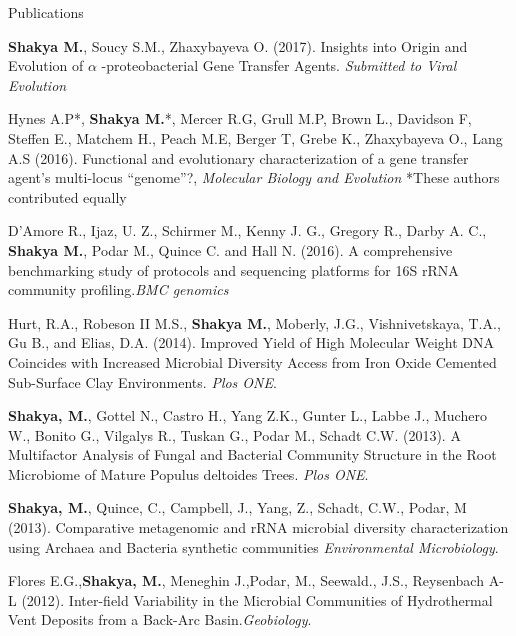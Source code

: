 \documentclass{resume} %
\begin{document}

\begin{rSection}{Publications}

\item \textbf{Shakya M.}, Soucy S.M., Zhaxybayeva O. (2017). Insights into Origin and Evolution of $\alpha$ -proteobacterial Gene Transfer Agents. \textit{Submitted to Viral Evolution}
\item Hynes A.P*, \textbf{Shakya M.}*, Mercer R.G, Grull M.P, Brown L., Davidson F, Steffen E., Matchem H., Peach M.E, Berger T, Grebe K., Zhaxybayeva O., Lang A.S (2016). Functional and evolutionary characterization of a gene transfer agent's multi-locus ``genome''?, \textit{Molecular Biology and Evolution} *{\tiny These authors contributed equally}
\item D’Amore R., Ijaz, U. Z., Schirmer M., Kenny J. G., Gregory R., Darby A. C., \textbf{Shakya M.}, Podar M., Quince C. and Hall N. (2016). A comprehensive benchmarking study of protocols and sequencing platforms for 16S rRNA community profiling.\textit{BMC genomics} 
\item Hurt, R.A., Robeson II M.S., \textbf{Shakya M.}, Moberly, J.G., Vishnivetskaya, T.A., Gu B., and Elias, D.A. (2014). Improved Yield of High Molecular Weight DNA Coincides with Increased Microbial Diversity Access from Iron Oxide Cemented Sub-Surface Clay Environments. \textit{Plos ONE}. 
 \item \textbf{Shakya, M.}, Gottel N., Castro H., Yang Z.K., Gunter L., Labbe J., Muchero W., Bonito G., Vilgalys R., Tuskan G., Podar M., Schadt C.W. (2013). A Multifactor Analysis of Fungal and Bacterial Community Structure in the Root Microbiome of Mature Populus deltoides Trees. \textit{Plos ONE}. 
\item \textbf{Shakya, M.}, Quince, C., Campbell, J., Yang, Z., Schadt, C.W., Podar, M (2013). Comparative metagenomic and rRNA microbial diversity characterization using Archaea and Bacteria synthetic communities \textit{Environmental Microbiology}.
\item Flores E.G.,\textbf{Shakya, M.}, Meneghin J.,Podar, M., Seewald., J.S., Reysenbach A-L (2012). Inter-field Variability in the Microbial Communities of Hydrothermal Vent Deposits from a Back-Arc Basin.\textit{Geobiology}. 
\end{rSection}
\end{document}
